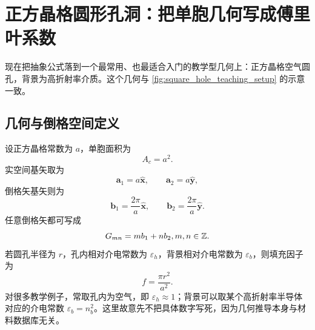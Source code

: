 \section{正方晶格圆形孔洞：把单胞几何写成傅里叶系数}
现在把抽象公式落到一个最常用、也最适合入门的教学型几何上：正方晶格空气圆孔，背景为高折射率介质。这个几何与 \cref{fig:square_hole_teaching_setup} 的示意一致。

\subsection{几何与倒格空间定义}
设正方晶格常数为 $a$，单胞面积为
\begin{equation}
A_c=a^2.
\end{equation}
实空间基矢取为
\begin{equation}
\bm a_1=a\hat{\bm x},
\qquad
\bm a_2=a\hat{\bm y},
\end{equation}
倒格矢基矢则为
\begin{equation}
\bm b_1=\frac{2\pi}{a}\hat{\bm x},
\qquad
\bm b_2=\frac{2\pi}{a}\hat{\bm y}.
\end{equation}
任意倒格矢都可写成
\begin{equation}
G_{mn}=mb_1+nb_2,
 m,n\in\mathbb Z.
\label{eq:square_reciprocal_index}
\end{equation}
若圆孔半径为 $r$，孔内相对介电常数为 $\varepsilon_h$，背景相对介电常数为 $\varepsilon_b$，则填充因子为
\begin{equation}
 f=\frac{\pi r^2}{a^2}.
\label{eq:filling_fraction_disk}
\end{equation}
对很多教学例子，常取孔内为空气，即 $\varepsilon_h\approx 1$；背景可以取某个高折射率半导体对应的介电常数 $\varepsilon_b=n_b^2$。这里故意先不把具体数字写死，因为几何推导本身与材料数据库无关。

